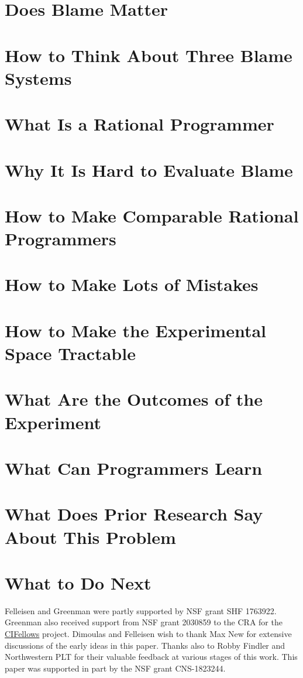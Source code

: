 \documentclass[acmsmall]{acmart}
\begin{document}


\maketitle

\def\sec#1#2{\section{#2} \label{sec:#1} }

\sec{introduction}{Does Blame Matter}

\sec{landscape}   {How to Think About Three Blame Systems}
\sec{why-rational}{What Is a Rational Programmer}
\sec{challenges}  {Why It Is Hard to Evaluate Blame}
\sec{rational}    {How to Make Comparable Rational Programmers}
\sec{mutate}      {How to Make Lots of Mistakes}
\sec{sample}      {How to Make the Experimental Space Tractable}
\sec{results}     {What Are the Outcomes of the Experiment}
\sec{discussion}  {What Can Programmers Learn}
\sec{related}     {What Does Prior Research Say About This Problem}
\sec{conclusion}  {What to Do Next}

\begin{acks}                 
Felleisen and Greenman were partly supported by NSF grant SHF
1763922.
Greenman also received support from NSF grant 2030859 to the CRA for the
\href{https://cifellows2020.org}{CIFellows} project.
Dimoulas and Felleisen wish to thank Max New for
extensive discussions of the early ideas in this paper. Thanks also to
Robby Findler and Northwestern PLT for their valuable feedback at
various stages of this work.
This paper was supported in part by the NSF grant CNS-1823244.
\end{acks}



\end{document}
